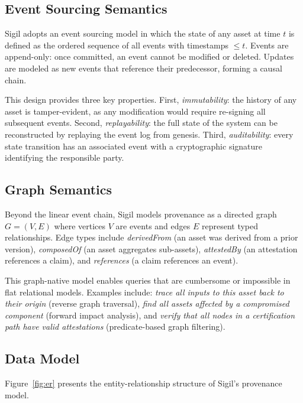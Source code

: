 \documentclass[conference]{IEEEtran}
\begin{document}
\subsection{Event Sourcing Semantics}

Sigil adopts an event sourcing model in which the state of any asset at time
$t$ is defined as the ordered sequence of all events with timestamps
$\leq t$.  Events are append-only: once committed, an event cannot be
modified or deleted.  Updates are modeled as new events that reference their
predecessor, forming a causal chain.

This design provides three key properties.  First, \emph{immutability}: the
history of any asset is tamper-evident, as any modification would require
re-signing all subsequent events.  Second, \emph{replayability}: the full
state of the system can be reconstructed by replaying the event log from
genesis.  Third, \emph{auditability}: every state transition has an associated
event with a cryptographic signature identifying the responsible party.

\subsection{Graph Semantics}

Beyond the linear event chain, Sigil models provenance as a directed graph
$G = (V, E)$ where vertices $V$ are events and edges $E$ represent typed
relationships.  Edge types include \emph{derivedFrom} (an asset was derived
from a prior version), \emph{composedOf} (an asset aggregates sub-assets),
\emph{attestedBy} (an attestation references a claim), and
\emph{references} (a claim references an event).

This graph-native model enables queries that are cumbersome or impossible in
flat relational models.  Examples include: \emph{trace all inputs to this
asset back to their origin} (reverse graph traversal), \emph{find all assets
affected by a compromised component} (forward impact analysis), and
\emph{verify that all nodes in a certification path have valid attestations}
(predicate-based graph filtering).

\subsection{Data Model}

Figure~\ref{fig:er} presents the entity-relationship structure of Sigil's
provenance model.
\end{document}
